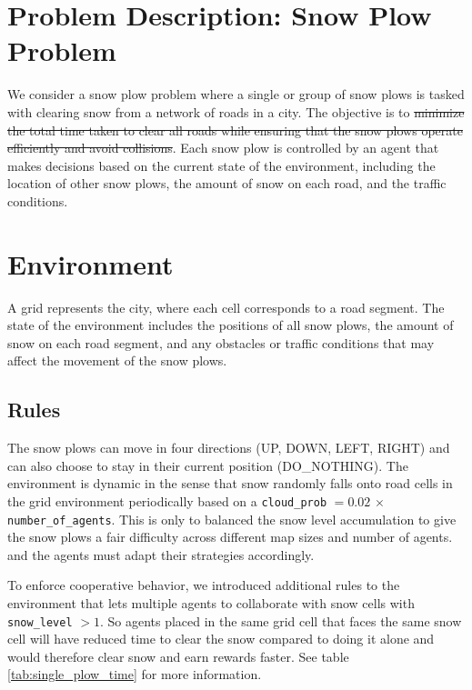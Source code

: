 \documentclass{scrartcl}
\title{\reportname}
\subtitle{Snow plow problem with multi-agent reinforcement learning}
\author{
    \textbf{Authors:} \\
    \textbf{Martin Nilsson}, \textit{School of Engineering}, Jönköping University
    \and
    \textbf{Besan Ewir}, \textit{School of Engineering}, Jönköping University
    \and
    \textbf{Vladimir Giustacchini}, \textit{School of Engineering}, Jönköping University
    \and
    \textbf{Jorge Cuello}, \textit{School of Engineering}, Jönköping University
}
\date{\today}
\theoremstyle{mytheoremstyle}
\theoremstyle{mytheoremstyle}
\theoremstyle{myproblemstyle}
\begin{document}
\raggedright

\maketitle

\tableofcontents

\newpage

\section{Problem Description: Snow Plow Problem}

We consider a snow plow problem where a single or group of snow plows is tasked with clearing snow from a network of roads in a city. The objective is to \st{minimize the total time taken to clear all roads while ensuring that the snow plows operate efficiently and avoid collisions}. Each snow plow is controlled by an agent that makes decisions based on the current state of the environment, including the location of other snow plows, the amount of snow on each road, and the traffic conditions.

\section{Environment}

A grid represents the city, where each cell corresponds to a road segment. The state of the environment includes the positions of all snow plows, the amount of snow on each road segment, and any obstacles or traffic conditions that may affect the movement of the snow plows.

\subsection{Rules}

The snow plows can move in four directions (UP, DOWN, LEFT, RIGHT) and can also choose to stay in their current position (DO\_NOTHING). The environment is dynamic in the sense that snow randomly falls onto road cells in the grid environment periodically based on a \verb|cloud_prob| $= 0.02$ $\times$ \verb|number_of_agents|. This is only to balanced the snow level accumulation to give the snow plows a fair difficulty across different map sizes and number of agents. and the agents must adapt their strategies accordingly.

To enforce cooperative behavior, we introduced additional rules to the environment that lets multiple agents to collaborate with snow cells with \verb|snow_level| $> 1$. So agents placed in the same grid cell that faces the same snow cell will have reduced time to clear the snow compared to doing it alone and would therefore clear snow and earn rewards faster. See table \ref{tab:single_plow_time} for more information.
\end{document}
